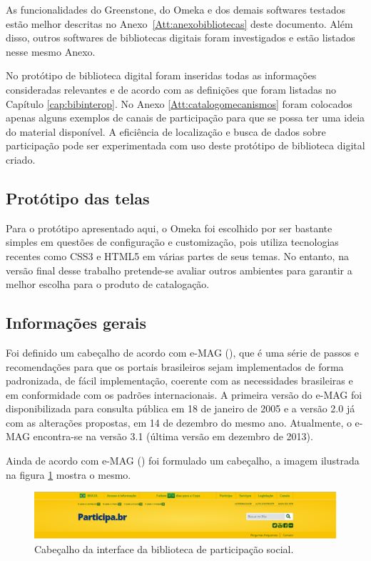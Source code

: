 As funcionalidades do Greenstone, do Omeka e dos demais softwares testados estão melhor descritas no Anexo~\ref{Att:anexobibliotecas} deste documento. Além disso, outros softwares de bibliotecas digitais foram investigados e estão listados nesse mesmo Anexo.

No protótipo de biblioteca digital foram inseridas todas as informações consideradas relevantes e de acordo com as definições que foram listadas no Capítulo \ref{cap:bibinterop}. No Anexo \ref{Att:catalogomecanismos} foram colocados apenas alguns exemplos de canais de participação para que se possa ter uma ideia do material disponível. A eficiência de localização e busca de dados sobre participação pode ser experimentada com uso deste protótipo de biblioteca digital criado. 

\subsection*{Protótipo das telas}

Para o protótipo apresentado aqui, o Omeka foi escolhido por ser bastante simples em questões de configuração e customização, pois utiliza tecnologias recentes como CSS3 e HTML5 em várias partes de seus temas. No entanto, na versão final desse trabalho pretende-se avaliar outros ambientes para garantir a melhor escolha para o produto de catalogação. 

\subsection*{Informações gerais}

Foi definido um cabeçalho de acordo com e-MAG (\citeyear{emag2013usabilidade}), que é uma série de passos e recomendações para que os portais brasileiros sejam implementados de forma padronizada, de fácil implementação, coerente com as necessidades brasileiras e em conformidade com os padrões internacionais. A primeira versão do e-MAG foi disponibilizada para consulta pública em 18 de janeiro de 2005 e a versão 2.0 já com as alterações propostas, em 14 de dezembro do mesmo ano. Atualmente, o e-MAG encontra-se na versão 3.1 (última versão em dezembro de 2013). 

Ainda de acordo com e-MAG (\citeyear{emag2013usabilidade}) foi formulado um cabeçalho, a imagem ilustrada na figura \ref{fig:cab_prototipo} mostra o mesmo.

\graphicspath{{figuras/prototipo/}}
\begin{figure}[H]
\centering
\includegraphics[width=1.0\textwidth]{cabecalho}
\caption{Cabeçalho da interface da biblioteca de participação social.}
\label{fig:cab_prototipo}
\end{figure}

